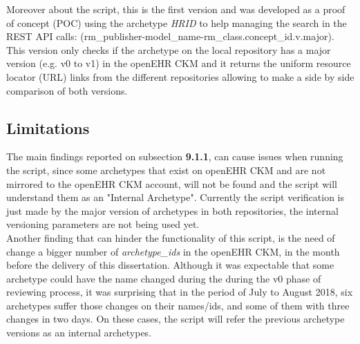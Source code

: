 \documentclass[mim_thesis.tex]{subfiles}
\begin{document}
Moreover about the script, this is the first version and was developed as a proof of concept (POC) using the archetype \textit{HRID} to help managing the search in the REST API calls: (rm\_publisher-model\_name-rm\_class.concept\_id.v.major). This version only checks if the archetype on the local repository has a major version (e.g. v0 to v1) in the openEHR CKM and it returns the uniform resource locator (URL) links from the different repositories allowing to make a side by side comparison of both versions. 

\subsection{Limitations}
The main findings reported on subsection \textbf{9.1.1}, can cause issues when running the script, since some archetypes that exist on openEHR CKM and are not mirrored to the openEHR CKM account, will not be found and the script will understand them as an "Internal Archetype". Currently the script verification is just made by the major version of archetypes in both repositories, the internal versioning parameters are not being used yet. \\

Another finding that can hinder the functionality of this script, is the need of change a bigger number of \textit{archetype\_ids} in the openEHR CKM, in the month before the delivery of this dissertation. Although it was expectable that some archetype could have the name changed during the during the v0 phase of reviewing process, it was surprising that in the period of July to August 2018, six archetypes suffer those changes on their names/ids, and some of them with three changes in two days. On these cases, the script will refer the previous archetype versions as an internal archetypes. 
\end{document}
